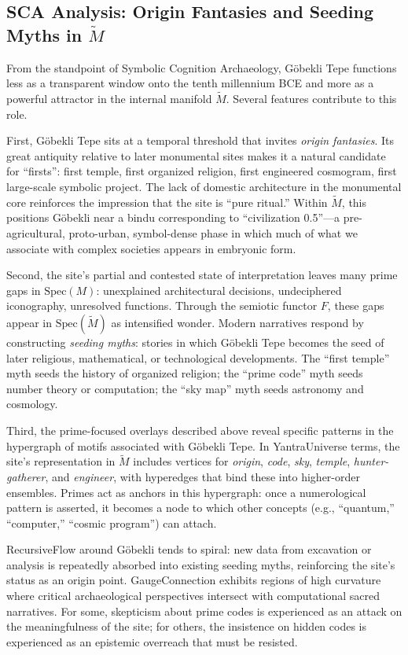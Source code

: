\documentclass[12]{amsart}
\theoremstyle{plain}
\begin{document}
\subsection{SCA Analysis: Origin Fantasies and Seeding Myths in $\tilde M$}

From the standpoint of Symbolic Cognition Archaeology, Göbekli Tepe functions less as a transparent window onto the tenth millennium BCE and more as a powerful attractor in the internal manifold $\tilde M$. Several features contribute to this role.

First, Göbekli Tepe sits at a temporal threshold that invites \emph{origin fantasies}. Its great antiquity relative to later monumental sites makes it a natural candidate for ``firsts'': first temple, first organized religion, first engineered cosmogram, first large-scale symbolic project. The lack of domestic architecture in the monumental core reinforces the impression that the site is ``pure ritual.'' Within $\tilde M$, this positions Göbekli near a bindu corresponding to ``civilization 0.5''---a pre-agricultural, proto-urban, symbol-dense phase in which much of what we associate with complex societies appears in embryonic form.

Second, the site's partial and contested state of interpretation leaves many prime gaps in $\mathrm{Spec}(M)$: unexplained architectural decisions, undeciphered iconography, unresolved functions. Through the semiotic functor $F$, these gaps appear in $\mathrm{Spec}(\tilde M)$ as intensified wonder. Modern narratives respond by constructing \emph{seeding myths}: stories in which Göbekli Tepe becomes the seed of later religious, mathematical, or technological developments. The ``first temple'' myth seeds the history of organized religion; the ``prime code'' myth seeds number theory or computation; the ``sky map'' myth seeds astronomy and cosmology.

Third, the prime-focused overlays described above reveal specific patterns in the hypergraph of motifs associated with Göbekli Tepe. In YantraUniverse terms, the site's representation in $\tilde M$ includes vertices for \emph{origin}, \emph{code}, \emph{sky}, \emph{temple}, \emph{hunter-gatherer}, and \emph{engineer}, with hyperedges that bind these into higher-order ensembles. Primes act as anchors in this hypergraph: once a numerological pattern is asserted, it becomes a node to which other concepts (e.g., ``quantum,'' ``computer,'' ``cosmic program'') can attach.

RecursiveFlow around Göbekli tends to spiral: new data from excavation or analysis is repeatedly absorbed into existing seeding myths, reinforcing the site's status as an origin point. GaugeConnection exhibits regions of high curvature where critical archaeological perspectives intersect with computational sacred narratives. For some, skepticism about prime codes is experienced as an attack on the meaningfulness of the site; for others, the insistence on hidden codes is experienced as an epistemic overreach that must be resisted.
\end{document}
